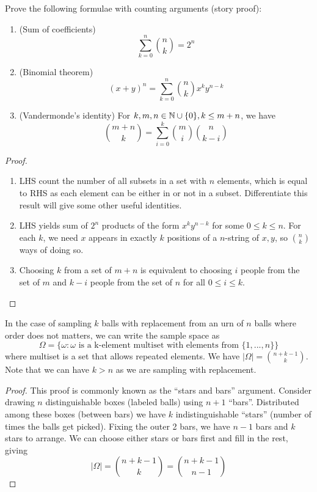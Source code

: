 \documentclass[11pt]{article}
\begin{document}
\begin{exercise}
  Prove the following formulae with counting arguments (story proof):
  \begin{enumerate}
    \item (Sum of coefficients)\[\sum_{k=0}^n\binom{n}{k}=2^n\]
    \item (Binomial theorem) \[(x+y)^n=\sum_{k=0}^n \binom{n}{k}x^ky^{n-k}\]
    \item (Vandermonde's identity) For \(k,m,n\in\mathbb{N}\cup\{0\},k
    \leq m+n\), we have \[\binom{m+n}{k}=\sum_{i=0}^k\binom{m}{i}\binom{n}{k-i}\]
  \end{enumerate}
\end{exercise}
\begin{proof}
  \begin{enumerate}
    \item LHS count the number of all subsets in a set with \(n\) elements, which is equal to RHS as each element can be either in or not in a subset. Differentiate this result will give some other useful identities.
    \item LHS yields sum of \(2^n\) products of the form \(x^ky^{n-k}\) for some \(0\leq k\leq n\). For each \(k\), we need \(x\) appears in exactly \(k\) positions of a \(n\)-string of \(x,y\), so \(\binom{n}{k}\) ways of doing so.
    \item Choosing \(k\) from a set of \(m+n\) is equivalent to choosing \(i\) people from the set of \(m\) and \(k-i\) people from the set of \(n\) for all \(0\leq i\leq k\).
  \end{enumerate}
\end{proof}

\begin{theorem}
  In the case of sampling \(k\) balls with replacement from an urn of \(n\) balls where order does not matters, we can write the sample space as
  \[\Omega=\{\omega:\omega \text{ is a k-element multiset with elements from } \{1,...,n\}\}\]
  where multiset is a set that allows repeated elements.
  We have \(|\Omega|=\binom{n+k-1}{k}\). Note that we can have \(k>n\) as we are sampling with replacement.
\end{theorem}
\begin{proof}
  This proof is commonly known as the ``stars and bars'' argument. Consider drawing \(n\) distinguishable boxes (labeled balls) using \(n+1\) ``bars''. Distributed among these boxes (between bars) we have \(k\) indistinguishable ``stars'' (number of times the balls get picked). Fixing the outer 2 bars, we have \(n-1\) bars and \(k\) stars to arrange. We can choose either stars or bars first and fill in the rest, giving
  \[|\Omega|=\binom{n+k-1}{k}=\binom{n+k-1}{n-1}\]
\end{proof}
\end{document}
